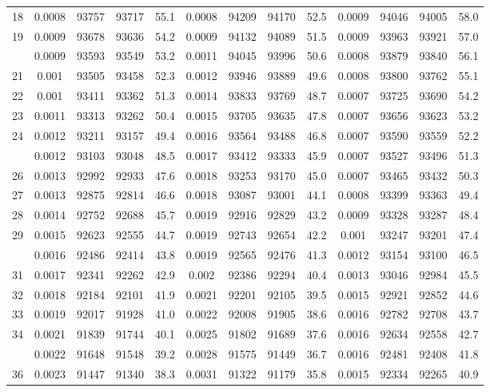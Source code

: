 \documentclass[
  14pt,
]{article}
\begin{document}
\begin{longtable}[t]{lcccccccccccc}
18 & 0.0008 & 93757 & 93717 & 55.1 & 0.0008 & 94209 & 94170 & 52.5 & 0.0009 & 94046 & 94005 & 58.0\\
19 & 0.0009 & 93678 & 93636 & 54.2 & 0.0009 & 94132 & 94089 & 51.5 & 0.0009 & 93963 & 93921 & 57.0\\
\addlinespace
20 & 0.0009 & 93593 & 93549 & 53.2 & 0.0011 & 94045 & 93996 & 50.6 & 0.0008 & 93879 & 93840 & 56.1\\
21 & 0.001 & 93505 & 93458 & 52.3 & 0.0012 & 93946 & 93889 & 49.6 & 0.0008 & 93800 & 93762 & 55.1\\
22 & 0.001 & 93411 & 93362 & 51.3 & 0.0014 & 93833 & 93769 & 48.7 & 0.0007 & 93725 & 93690 & 54.2\\
23 & 0.0011 & 93313 & 93262 & 50.4 & 0.0015 & 93705 & 93635 & 47.8 & 0.0007 & 93656 & 93623 & 53.2\\
24 & 0.0012 & 93211 & 93157 & 49.4 & 0.0016 & 93564 & 93488 & 46.8 & 0.0007 & 93590 & 93559 & 52.2\\
\addlinespace
25 & 0.0012 & 93103 & 93048 & 48.5 & 0.0017 & 93412 & 93333 & 45.9 & 0.0007 & 93527 & 93496 & 51.3\\
26 & 0.0013 & 92992 & 92933 & 47.6 & 0.0018 & 93253 & 93170 & 45.0 & 0.0007 & 93465 & 93432 & 50.3\\
27 & 0.0013 & 92875 & 92814 & 46.6 & 0.0018 & 93087 & 93001 & 44.1 & 0.0008 & 93399 & 93363 & 49.4\\
28 & 0.0014 & 92752 & 92688 & 45.7 & 0.0019 & 92916 & 92829 & 43.2 & 0.0009 & 93328 & 93287 & 48.4\\
29 & 0.0015 & 92623 & 92555 & 44.7 & 0.0019 & 92743 & 92654 & 42.2 & 0.001 & 93247 & 93201 & 47.4\\
\addlinespace
30 & 0.0016 & 92486 & 92414 & 43.8 & 0.0019 & 92565 & 92476 & 41.3 & 0.0012 & 93154 & 93100 & 46.5\\
31 & 0.0017 & 92341 & 92262 & 42.9 & 0.002 & 92386 & 92294 & 40.4 & 0.0013 & 93046 & 92984 & 45.5\\
32 & 0.0018 & 92184 & 92101 & 41.9 & 0.0021 & 92201 & 92105 & 39.5 & 0.0015 & 92921 & 92852 & 44.6\\
33 & 0.0019 & 92017 & 91928 & 41.0 & 0.0022 & 92008 & 91905 & 38.6 & 0.0016 & 92782 & 92708 & 43.7\\
34 & 0.0021 & 91839 & 91744 & 40.1 & 0.0025 & 91802 & 91689 & 37.6 & 0.0016 & 92634 & 92558 & 42.7\\
\addlinespace
35 & 0.0022 & 91648 & 91548 & 39.2 & 0.0028 & 91575 & 91449 & 36.7 & 0.0016 & 92481 & 92408 & 41.8\\
36 & 0.0023 & 91447 & 91340 & 38.3 & 0.0031 & 91322 & 91179 & 35.8 & 0.0015 & 92334 & 92265 & 40.9\\

\end{longtable}
\end{document}
